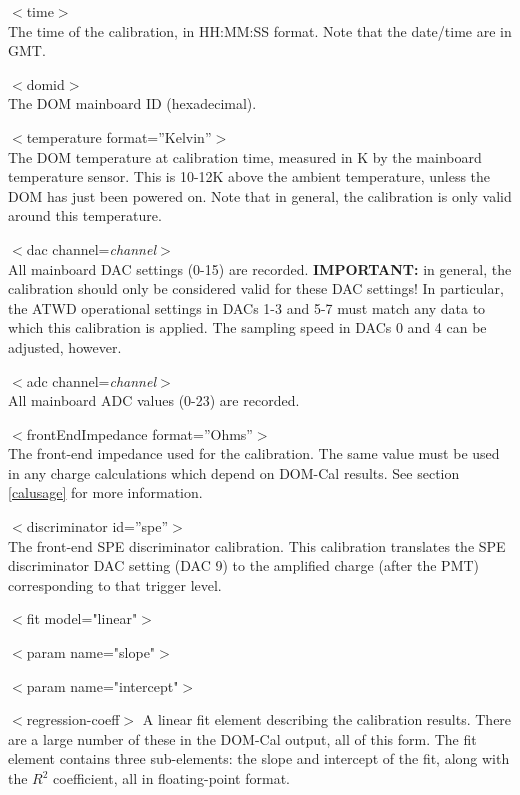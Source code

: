 \documentclass[10pt]{article}
\begin{document}
\item{$<$time$>$}\\
 The time of the calibration, in HH:MM:SS format.  Note that the date/time
 are in GMT.

\item{$<$domid$>$}\\
 The DOM mainboard ID (hexadecimal).

\item{$<$temperature format=''Kelvin''$>$}\\
 The DOM temperature at calibration time, measured in K by the mainboard
 temperature sensor.  This is 10-12K above the ambient temperature, unless
 the DOM has just been powered on.  Note that in general, the calibration
 is only valid around this temperature.

\item{$<$dac channel=\textit{channel}$>$}\\
 All mainboard DAC settings (0-15) are recorded.  {\bf IMPORTANT:} in
 general, the calibration should only be considered valid for these DAC
 settings!  In particular, the ATWD operational settings in DACs 1-3 and
 5-7 must  match any data to which this calibration is applied.  The
 sampling speed in DACs 0 and 4 can be adjusted, however.

\item{$<$adc channel=\textit{channel}$>$}\\
 All mainboard ADC values (0-23) are recorded.

\item{$<$frontEndImpedance format=''Ohms''$>$}\\
 The front-end impedance used for the calibration.  The same value must be
 used in any charge calculations which depend on DOM-Cal results.  See
 section \ref{calusage} for more information.


\item{$<$discriminator id=''spe''$>$}\\
 The front-end SPE discriminator calibration.  This calibration translates the
 SPE discriminator DAC setting (DAC 9) to the amplified charge (after the
 PMT) corresponding to that trigger level. 
\bi
\item{$<$fit model="linear"$>$}
\bi
\item{$<$param name="slope"$>$}
\item{$<$param name="intercept"$>$}
\item{$<$regression-coeff$>$}
\ei
A linear fit element describing the calibration results.  There are a large
number of these in the DOM-Cal output, all of this form.  The fit element
contains three sub-elements: the slope and intercept of the fit, along with
the $R^2$ coefficient, all in floating-point format. 
\end{document}
